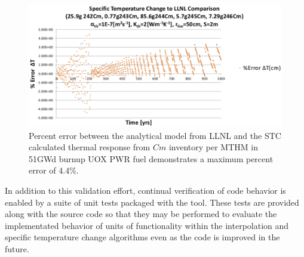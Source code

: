 \begin{figure}[htp!]
\begin{center}
\includegraphics[width=\columnwidth]{./chapters/methodology/thermal_models/CmPercentError.eps}
\end{center}
\caption{Percent error between the analytical model from LLNL and the \gls{STC} 
calculated thermal response from $Cm$ inventory per MTHM in 51GWd burnup UOX 
PWR fuel demonstrates a maximum percent error of 4.4\%.}
\label{fig:CmPercentError}
\end{figure}
In addition to this validation effort, continual verification of code behavior 
is enabled by a suite of unit tests packaged with the tool. These tests are 
provided along with the source code so that they may be performed to evaluate 
the implementated behavior of units of functionality within the interpolation 
and specific temperature change algorithms even as the code is improved in the 
future.  
